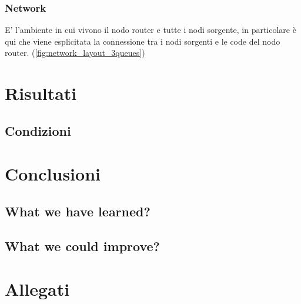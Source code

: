 \documentclass[conference]{IEEEtran}
\begin{document}
\subsubsection{Network}
E' l'ambiente in cui vivono il nodo router e tutte i nodi sorgente, in particolare è qui che viene esplicitata la connessione tra i nodi sorgenti e le code del nodo router. (\autoref{fig:network_layout_3queues}) 

\section{Risultati}

\subsection{Condizioni}


\section{Conclusioni}

\subsection{What we have learned?}

\subsection{What we could improve?}

\section{Allegati}
\end{document}
